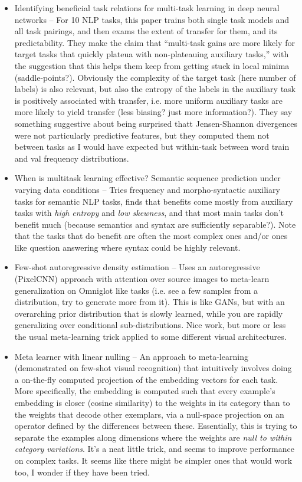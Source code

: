\documentclass[10pt]{article}
\begin{document}
\begin{itemize}
\item Identifying beneficial task relations for multi-task learning in deep neural networks -- For 10 NLP tasks, this paper trains both single task models and all task pairings, and then exams the extent of transfer for them, and its predictability. They make the claim that ``multi-task gains are more likely for target tasks that quickly plateua with non-plateauing auxiliary tasks,'' with the suggestion that this helps them keep from getting stuck in local minima (saddle-points?). Obviously the complexity of the target task (here number of labels) is also relevant, but also the entropy of the labels in the auxiliary task is positively associated with transfer, i.e. more uniform auxiliary tasks are more likely to yield transfer (less biasing? just more information?). They say something suggestive about being surprised thatt Jensen-Shannon divergences were not particularly predictive features, but they computed them not between tasks as I would have expected but within-task between word train and val frequency distributions.  \citep{Bingel2017}
\item When is multitask learning effective? Semantic sequence prediction under varying data conditions -- Tries frequency and morpho-syntactic auxiliary tasks for semantic NLP tasks, finds that benefits come mostly from auxiliary tasks with \emph{high entropy} and \emph{low skewness}, and that most main tasks don't benefit much (because semantics and syntax are sufficiently separable?). Note that the tasks that do benefit are often the most complex ones and/or ones like question answering where syntax could be highly relevant. \citep{Alonso2017} 
\item Few-shot autoregressive density estimation -- Uses an autoregressive (PixelCNN) approach with attention over source images to meta-learn generalization on Omniglot like tasks (i.e. see a few samples from a distribution, try to generate more from it). This is like GANs, but with an overarching prior distribution that is slowly learned, while you are rapidly generalizing over conditional sub-distributions. Nice work, but more or less the usual meta-learning trick applied to some different visual architectures. \citep{Reed2018}
\item Meta learner with linear nulling -- An approach to meta-learning (demonstrated on few-shot visual recognition) that intuitively involves doing a on-the-fly computed projection of the embedding vectors for each task. More specifically, the embedding is computed such that every example's embedding is closer (cosine similarity) to the weights in its category than to the weights that decode other exemplars, via a null-space projection on an operator defined by the differences between these. Essentially, this is trying to separate the examples along dimensions where the weights are \emph{null to within category variations}. It's a neat little trick, and seems to improve performance on complex tasks. It seems like there might be simpler ones that would work too, I wonder if they have been tried. \citep{Yoon2018}

\end{itemize}
\end{document}
